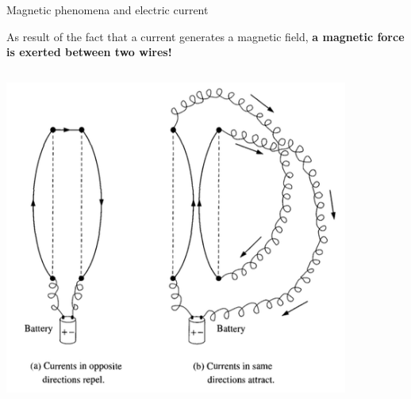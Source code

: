 \begin{frame}{Magnetic phenomena and electric current}

As result of the fact that a current generates a magnetic field,
{\bf a magnetic force is exerted between two wires!}\\

\begin{columns}
  \begin{column}{0.60\textwidth}
    \begin{center}
      \includegraphics[width=0.90\textwidth]{./images/schematics/magnetic_force_between_wires_01.png}\\
    \end{center}
  \end{column}
  \begin{column}{0.30\textwidth}
    \begin{center}

\end{center}
\end{column}
\end{columns}
\end{frame}
